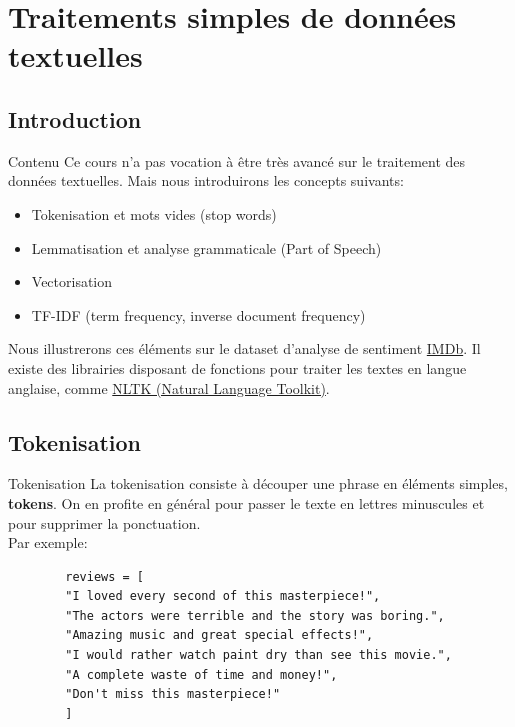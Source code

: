\section[Traitements simples de données textuelles]{Traitements simples de données textuelles}

\subsection[Introduction]{Introduction}

\begin{frame}{Contenu}
	Ce cours n'a pas vocation à être très avancé sur le traitement des données textuelles. Mais nous introduirons les concepts suivants:
	\begin{itemize}
		\item Tokenisation et mots vides (stop words)
		\item Lemmatisation et analyse grammaticale (Part of Speech)
		\item Vectorisation
		\item TF-IDF (term frequency, inverse document frequency)
	\end{itemize}
	Nous illustrerons ces éléments sur le dataset d'analyse de sentiment \href{https://www.kaggle.com/datasets/yasserh/imdb-movie-ratings-sentiment-analysis}{IMDb}. Il existe des librairies disposant de fonctions pour traiter les textes en langue anglaise, comme \href{https://www.nltk.org/}{NLTK (Natural Language Toolkit)}.
\end{frame}

\subsection[Tokenisation]{Tokenisation}

\begin{frame}[fragile]{Tokenisation}
	La tokenisation consiste à découper une phrase en éléments simples, \textbf{tokens}. On en profite en général pour passer le texte en lettres minuscules et pour supprimer la ponctuation.\\
	
	Par exemple:
	\begin{lstlisting}
		reviews = [
		"I loved every second of this masterpiece!",
		"The actors were terrible and the story was boring.",
		"Amazing music and great special effects!",
		"I would rather watch paint dry than see this movie.",
		"A complete waste of time and money!",
		"Don't miss this masterpiece!"
		]
	\end{lstlisting}
\end{frame}

